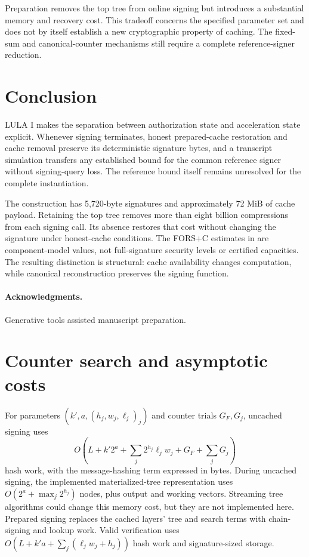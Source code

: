 \documentclass[a4paper,envcountsame,runningheads]{llncs}
\begin{document}
Preparation removes the top tree from online signing but introduces a substantial memory and recovery cost. This tradeoff concerns the specified parameter set and does not by itself establish a new cryptographic property of caching. The fixed-sum and canonical-counter mechanisms still require a complete reference-signer reduction.

\section{Conclusion}\label{sec:conclusion}
LULA I makes the separation between authorization state and acceleration state explicit. Whenever signing terminates, honest prepared-cache restoration and cache removal preserve its deterministic signature bytes, and a transcript simulation transfers any established bound for the common reference signer without signing-query loss. The reference bound itself remains unresolved for the complete instantiation.

The construction has 5,720-byte signatures and approximately 72 MiB of cache payload. Retaining the top tree removes more than eight billion compressions from each signing call. Its absence restores that cost without changing the signature under honest-cache conditions. The FORS+C estimates in  are component-model values, not full-signature security levels or certified capacities. The resulting distinction is structural: cache availability changes computation, while canonical reconstruction preserves the signing function.

\paragraph{Acknowledgments.}
Generative tools assisted manuscript preparation.



\appendix
\section{Counter search and asymptotic costs}\label{app:search}
For parameters $(k',a,(h_j,w_j,\ell_j)_j)$ and counter trials $G_F,G_j$, uncached signing uses
\[
 O\!\left(L+k'2^a+\sum_j 2^{h_j}\ell_jw_j+G_F+\sum_jG_j\right)
\]
hash work, with the message-hashing term expressed in bytes. During uncached signing, the implemented materialized-tree representation uses $O(2^a+\max_j2^{h_j})$ nodes, plus output and working vectors. Streaming tree algorithms could change this memory cost, but they are not implemented here. Prepared signing replaces the cached layers' tree and search terms with chain-signing and lookup work. Valid verification uses $O(L+k'a+\sum_j(\ell_jw_j+h_j))$ hash work and signature-sized storage.
\end{document}
